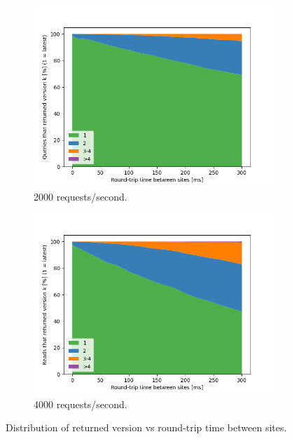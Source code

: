\begin{figure}[H]
  \begin{subfigure}{0.5\textwidth}
    \includegraphics[width=\linewidth]{./figures/evaluation/readV_freshness_netLatency_200.png}
    \caption{2000 requests/second.}
    \label{fig:readV_freshness_netLatency_200}
  \end{subfigure}%
  \hspace*{\fill}
  \begin{subfigure}{0.5\textwidth}
    \includegraphics[width=\linewidth]{./figures/evaluation/readV_freshness_netLatency_400.png}
    \caption{4000 requests/second.}
    \label{fig:readV_freshness_netLatency_400}
  \end{subfigure}%
\caption{Distribution of returned version vs round-trip time between sites.}
\label{fig:readV_freshness_netLatency}
\end{figure}

